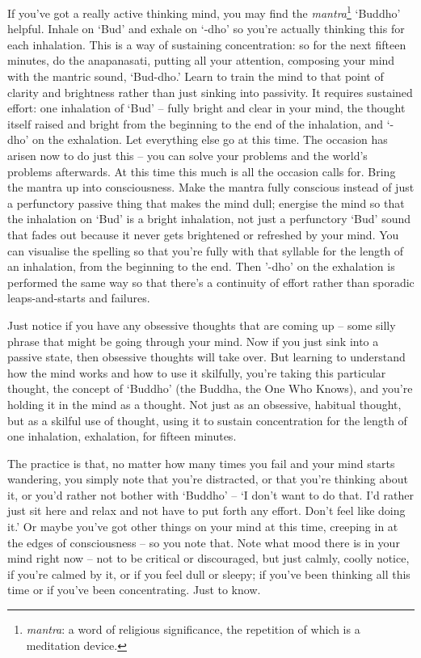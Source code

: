 
If you've got a really active thinking mind, you may find the \textit{mantra}\footnote{\textit{mantra}: a word of religious significance, the repetition of which is a meditation device.} `Buddho' helpful. Inhale on `Bud' and exhale on `-dho' so you're actually thinking this for each inhalation. This is a way of sustaining concentration: so for the next fifteen minutes, do the anapanasati, putting all your attention, composing your mind with the mantric sound, `Bud-dho.' Learn to train the mind to that point of clarity and brightness rather than just sinking into passivity. It requires sustained effort: one inhalation of `Bud' -- fully bright and clear in your mind, the thought itself raised and bright from the beginning to the end of the inhalation, and `-dho' on the exhalation. Let everything else go at this time. The occasion has arisen now to do just this -- you can solve your problems and the world's problems afterwards. At this time this much is all the occasion calls for. Bring the mantra up into consciousness. Make the mantra fully conscious instead of just a perfunctory passive thing that makes the mind dull; energise the mind so that the inhalation on `Bud' is a bright inhalation, not just a perfunctory `Bud' sound that fades out because it never gets brightened or refreshed by your mind. You can visualise the spelling so that you're fully with that syllable for the length of an inhalation, from the beginning to the end. Then '-dho' on the exhalation is performed the same way so that there's a continuity of effort rather than sporadic leaps-and-starts and failures.

Just notice if you have any obsessive thoughts that are coming up -- some silly phrase that might be going through your mind. Now if you just sink into a passive state, then obsessive thoughts will take over. But learning to understand how the mind works and how to use it skilfully, you're taking this particular thought, the concept of `Buddho' (the Buddha, the One Who Knows), and you're holding it in the mind as a thought. Not just as an obsessive, habitual thought, but as a skilful use of thought, using it to sustain concentration for the length of one inhalation, exhalation, for fifteen minutes.

The practice is that, no matter how many times you fail and your mind starts wandering, you simply note that you're distracted, or that you're thinking about it, or you'd rather not bother with `Buddho' -- `I don't want to do that. I'd rather just sit here and relax and not have to put forth any effort. Don't feel like doing it.' Or maybe you've got other things on your mind at this time, creeping in at the edges of consciousness -- so you note that. Note what mood there is in your mind right now -- not to be critical or discouraged, but just calmly, coolly notice, if you're calmed by it, or if you feel dull or sleepy; if you've been thinking all this time or if you've been concentrating. Just to know.

